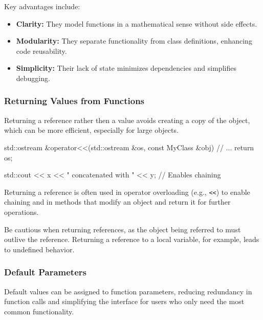 Key advantages include:
\begin{itemize}
    \item \textbf{Clarity:} They model functions in a mathematical sense without side effects.
    \item \textbf{Modularity:} They separate functionality from class definitions, enhancing code reusability.
    \item \textbf{Simplicity:} Their lack of state minimizes dependencies and simplifies debugging.
\end{itemize}

\subsubsection{Returning Values from Functions}

\vspace{-0.5em}

Returning a reference rather then a value avoids creating a copy of the object, which can be more efficient, especially for large objects.

\vspace{-0.5em}

\begin{codeblock}[language=C++, numbers=none]
std::ostream &operator<<(std::ostream &os, const MyClass &obj) {
    // ...
    return os;
}

std::cout << x << " concatenated with " << y; // Enables chaining
\end{codeblock}

\vspace{-0.5em}

Returning a reference is often used in operator overloading (e.g., \texttt{<<}) to enable chaining and in methods that modify an object and return it for further operations.

\begin{warningblock}
    Be cautious when returning references, as the object being referred to must outlive the reference.  Returning a reference to a local variable, for example, leads to undefined behavior.
\end{warningblock}

\subsubsection{Default Parameters}

Default values can be assigned to function parameters, reducing redundancy in function calls and simplifying the interface for users who only need the most common functionality.

